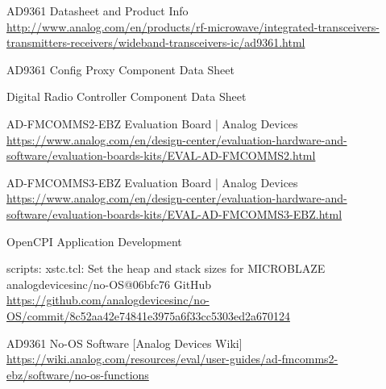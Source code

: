 \documentclass{article}
\begin{document}
\begin{thebibliography}{1}

   AD9361 Datasheet and Product Info \\
  \url{http://www.analog.com/en/products/rf-microwave/integrated-transceivers-transmitters-receivers/wideband-transceivers-ic/ad9361.html}

   AD9361 Config Proxy Component Data Sheet\\

   Digital Radio Controller Component Data Sheet \\

   AD-FMCOMMS2-EBZ Evaluation Board | Analog Devices\\
  \url{https://www.analog.com/en/design-center/evaluation-hardware-and-software/evaluation-boards-kits/EVAL-AD-FMCOMMS2.html}

   AD-FMCOMMS3-EBZ Evaluation Board | Analog Devices\\
  \url{https://www.analog.com/en/design-center/evaluation-hardware-and-software/evaluation-boards-kits/EVAL-AD-FMCOMMS3-EBZ.html}

   OpenCPI Application Development \\

   scripts: xstc.tcl: Set the heap and stack sizes for MICROBLAZE analogdevicesinc/no-OS@06bfc76 GitHub\\
  \url{https://github.com/analogdevicesinc/no-OS/commit/8c52aa42e74841e3975a6f33cc5303ed2a670124}

   AD9361 No-OS Software [Analog Devices Wiki]\\
  \url{https://wiki.analog.com/resources/eval/user-guides/ad-fmcomms2-ebz/software/no-os-functions}

\end{thebibliography}
\end{document}

